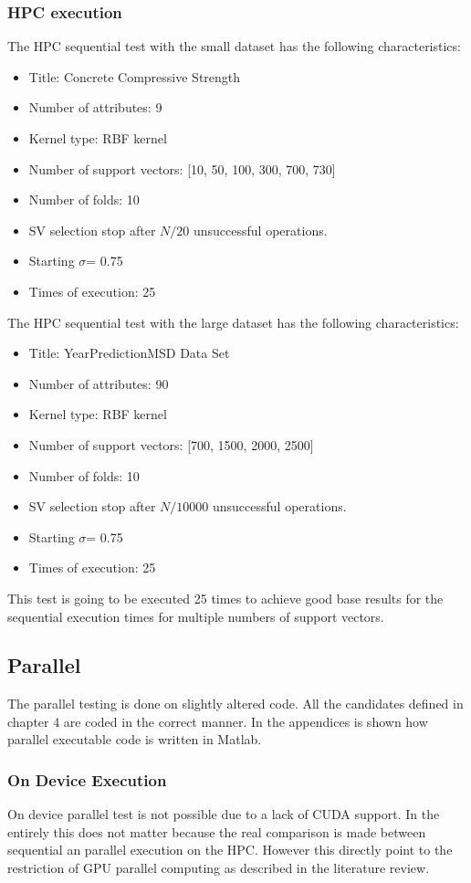 \subsubsection{HPC execution}
The HPC sequential test with the small dataset has the following characteristics:
\begin{itemize}
	\item Title: Concrete Compressive Strength\cite{UCIMachi66:online}
	\item Number of attributes: 9
	\item Kernel type: RBF kernel
	\item Number of support vectors: [10, 50, 100, 300, 700, 730]
	\item Number of folds: 10
	\item SV selection stop after $N/20$ unsuccessful operations.
	\item Starting $\sigma$= 0.75
	\item Times of execution: 25
\end{itemize}
The HPC sequential test with the large dataset has the following characteristics:
\begin{itemize}
	\item Title: YearPredictionMSD Data Set\cite{UCIMachi93:online}
	\item Number of attributes: 90
	\item Kernel type: RBF kernel
	\item Number of support vectors: [700, 1500, 2000, 2500]
	\item Number of folds: 10
	\item SV selection stop after $N/10000$ unsuccessful operations.
	\item Starting $\sigma$= 0.75
	\item Times of execution: 25
\end{itemize}
This test is going to be executed 25 times to achieve good base results for the sequential execution times for multiple numbers of support vectors.
\subsection{Parallel}
The parallel testing is done on slightly altered code. 
All the candidates defined in chapter 4 are coded in the correct manner.
In the appendices is shown how parallel executable code is written in Matlab.
\subsubsection{On Device Execution}
On device parallel test is not possible due to a lack of CUDA support.
In the entirely this does not matter because the real comparison is made between sequential an parallel execution on the HPC.
However this directly point to the restriction of GPU parallel computing as described in the literature review.
